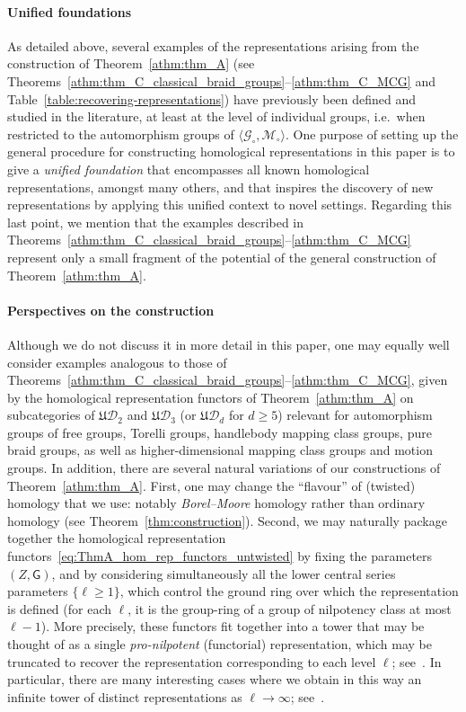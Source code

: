 \documentclass[AHL,Unicode,published]{cedram}
\newcommand{\fU}{\ensuremath{\mathfrak{U}}}
\newcommand{\sG}{\mathsf{G}}
\newcommand{\cD}{\mathcal{D}}
\newcommand{\cG}{\mathcal{G}}
\newcommand{\cM}{\mathcal{M}}
\renewcommand{\geq}{\geqslant}
\begin{document}
\paragraph*{Unified foundations}
As detailed above, several examples of the representations arising from the construction of Theorem~\ref{athm:thm_A} (see Theorems~\ref{athm:thm_C_classical_braid_groups}--\ref{athm:thm_C_MCG} and Table~\ref{table:recovering-representations}) have previously been defined and studied in the literature, at least at the level of individual groups, i.e.~when restricted to the automorphism groups of $\langle \cG_{\circ}, \cM_{\circ} \rangle$. One purpose of setting up the general procedure for constructing homological representations in this paper is to give a \emph{unified foundation} that encompasses all known homological representations, amongst many others, and that inspires the discovery of new representations by applying this unified context to novel settings. Regarding this last point, we mention that the examples described in Theorems~\ref{athm:thm_C_classical_braid_groups}--\ref{athm:thm_C_MCG} represent only a small fragment of the potential of the general construction of Theorem~\ref{athm:thm_A}.


\paragraph*{Perspectives on the construction}
Although we do not discuss it in more detail in this paper, one may equally well consider examples analogous to those of Theorems~\ref{athm:thm_C_classical_braid_groups}--\ref{athm:thm_C_MCG}, given by the homological representation functors of Theorem~\ref{athm:thm_A} on subcategories of $\fU\cD_{2}$ and $\fU\cD_3$ (or $\fU\cD_{d}$ for $d\geq5$) relevant for automorphism groups of free groups, Torelli groups, handlebody mapping class groups, pure braid groups, as well as higher-dimensional mapping class groups and motion groups. In addition, there are several natural variations of our constructions of Theorem~\ref{athm:thm_A}. First, one may change the ``flavour'' of (twisted) homology that we use: notably \emph{Borel--Moore} homology rather than ordinary homology (see Theorem~\ref{thm:construction}). Second, we may naturally package together the homological representation functors~\eqref{eq:ThmA_hom_rep_functors_untwisted} by fixing the parameters $(Z,\sG)$, and by considering simultaneously all the lower central series parameters $\{\ell \geq 1\}$, which control the ground ring over which the representation is defined (for each $\ell$, it is the group-ring of a group of nilpotency class at most $\ell - 1$). More precisely, these functors fit together into a tower that may be thought of as a single \emph{pro-nilpotent} (functorial) representation, which may be truncated to recover the representation corresponding to each level $\ell$; see~\cite[\S~1]{PSIN}. In particular, there are many interesting cases where we obtain in this way an infinite tower of distinct representations as $\ell \to \infty$; see~\cite[\S~4--\S~6]{PSIN}.
\end{document}
